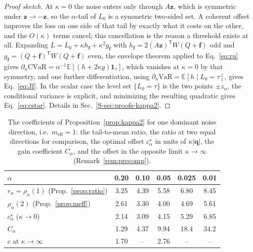 \documentclass[aps,pra,twocolumn,superscriptaddress,reprint,nofootinbib,floatfix]{revtex4-2}
\theoremstyle{definition}
\newcommand{\cvar}{\mathrm{CVaR}}
\newcommand{\E}{\mathbb{E}}
\newcommand{\sref}[1]{Sec.~\ref{S-#1}}
\begin{document}
\begin{proof}[Proof sketch]
At $\kappa=0$ the noise enters only through $A\mathbf z$, which is symmetric
under $\mathbf z\to-\mathbf z$, so the $\alpha$-tail of $L_0$ is a symmetric
two-sided set. A coherent offset improves the loss on one side of that tail by
exactly what it costs on the other, and the $O(\kappa)$ terms cancel; this
cancellation is the reason a threshold exists at all. Expanding
$L=L_0+\kappa h_{\mathbf f}+\kappa^2g_{\mathbf f}$ with
$h_{\mathbf f}=2(A\mathbf z)^{\mathsf T}W(Q+\mathbf f)$ odd and
$g_{\mathbf f}=(Q+\mathbf f)^{\mathsf T}W(Q+\mathbf f)$ even, the envelope
theorem applied to Eq.~\eqref{eq:ru} gives
$\partial_\kappa\cvar=\alpha^{-1}\E[(h+2\kappa g)\mathbf 1_\tau]$, which
vanishes at $\kappa=0$ by that symmetry, and one further differentiation,
using $\partial_\kappa\mathrm{VaR}=\E[h\mid L_0=\tau]$, gives
Eq.~\eqref{eq:Jf}. In the scalar case the level set $\{L_0=\tau\}$ is the two
points $\pm z_\alpha$, the conditional variance is explicit, and minimizing the
resulting quadratic gives Eq.~\eqref{eq:cstar}. Details in \sref{sec:proofs-kappa2}.
\end{proof}

\begin{table}[b]
\caption{The coefficients of Proposition~\ref{prop:kappa2} for one dominant
noise direction, i.e.\ $m_{\mathrm{eff}}=1$: the tail-to-mean ratio, the ratio
at two equal directions for comparison, the optimal offset $c^\star_\alpha$ in
units of $\kappa|\mathbf q|$, the gain coefficient $C_\alpha$, and the offset
in the opposite limit $\kappa\to\infty$ (Remark~\ref{rem:precomp}).}
\label{tab:kappa2}
\begin{ruledtabular}
\begin{tabular}{lccccc}
$\alpha$ & 0.20 & 0.10 & 0.05 & 0.025 & 0.01\\
\hline
$r_\alpha=\rho_\alpha(1)$ (Prop.~\ref{prop:ratio}) & 3.25 & 4.39 & 5.58 & 6.80 & 8.45\\
$\rho_\alpha(2)$ (Prop.~\ref{prop:meff}) & 2.61 & 3.30 & 4.00 & 4.69 & 5.61\\
$c^\star_\alpha$ ($\kappa\to0$) & 2.14 & 3.09 & 4.15 & 5.29 & 6.85\\
$C_\alpha$ & 1.29 & 4.37 & 9.94 & 18.4 & 34.2\\
$c$ at $\kappa\to\infty$ & 1.70 & -- & 2.76 & -- & --\\
\end{tabular}
\end{ruledtabular}
\end{table}
\end{document}
